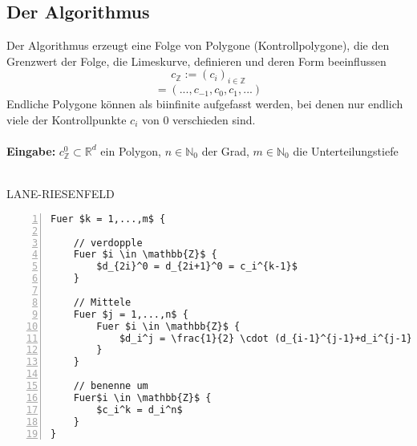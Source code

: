 \subsection{Der Algorithmus}
Der Algorithmus erzeugt eine Folge von Polygone (Kontrollpolygone), die den Grenzwert der Folge, die Limeskurve, definieren und deren Form beeinflussen
\[c_{\mathbb{Z}} := (c_i)_{i \in \mathbb{Z}}\]
\[= (...,c_{-1},c_0,c_1,...)\]
Endliche Polygone können als biinfinite aufgefasst werden, bei denen nur endlich viele der Kontrollpunkte \(c_i\) von \(0\) verschieden sind.
\\\\
\textbf{Eingabe:} \(c_{\mathbb{Z}}^0 \subset \mathbb{R}^d\) ein Polygon, \(n \in \mathbb{N}_0\) der Grad, \(m \in \mathbb{N}_0\) die Unterteilungstiefe
\\\\
\begin{minipage}{\textwidth}
LANE-RIESENFELD
\begin{lstlisting}[frame=single,numbers=left,mathescape]
Fuer $k = 1,...,m$ {

	// verdopple
	Fuer $i \in \mathbb{Z}$ {
		$d_{2i}^0 = d_{2i+1}^0 = c_i^{k-1}$
	}

	// Mittele
	Fuer $j = 1,...,n$ {
		Fuer $i \in \mathbb{Z}$ {
			$d_i^j = \frac{1}{2} \cdot (d_{i-1}^{j-1}+d_i^{j-1})$ 
		}
	}

	// benenne um
	Fuer$i \in \mathbb{Z}$ {
		$c_i^k = d_i^n$
	}
}
\end{lstlisting}
\end{minipage}


